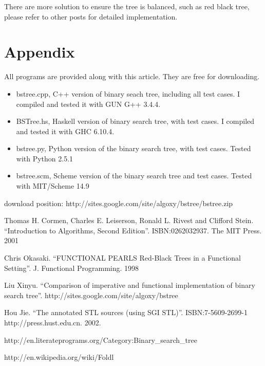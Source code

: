 \documentclass{article}
\begin{document}
There are more solution to ensure the tree is balanced, such as red black tree,
please refer to other posts for detailed implementation.

\section{Appendix} \label{appendix}
All programs are provided along with this article. They are free for downloading.
\begin{itemize}
\item bstree.cpp, C++ version of binary seach tree, including all test cases. I 
compiled and tested it with GUN G++ 3.4.4.
\item BSTree.hs, Haskell version of binary search tree, with test cases. I compiled
and tested it with GHC 6.10.4.
\item bstree.py, Python version of the binary search tree, with test cases. Tested
with Python 2.5.1
\item bstree.scm, Scheme version of the binary search tree and test cases. Tested
with MIT/Scheme 14.9
\end{itemize}
download position: http://sites.google.com/site/algoxy/bstree/bstree.zip

\begin{thebibliography}{99}

Thomas H. Cormen, Charles E. Leiserson, Ronald L. Rivest and Clifford Stein. 
``Introduction to Algorithms, Second Edition''. ISBN:0262032937. The MIT Press. 2001

Chris Okasaki. ``FUNCTIONAL PEARLS Red-Black Trees in a Functional Setting''. J. Functional Programming. 1998

Liu Xinyu. ``Comparison of imperative and functional implementation of binary search tree''. http://sites.google.com/site/algoxy/bstree

Hou Jie. ``The annotated STL sources (using SGI STL)''. ISBN:7-5609-2699-1 http://press.hust.edu.cn. 2002.

http://en.literateprograms.org/Category:Binary\_search\_tree

http://en.wikipedia.org/wiki/Foldl

\end{thebibliography}

\ifx\wholebook\relax\else
\end{document}
